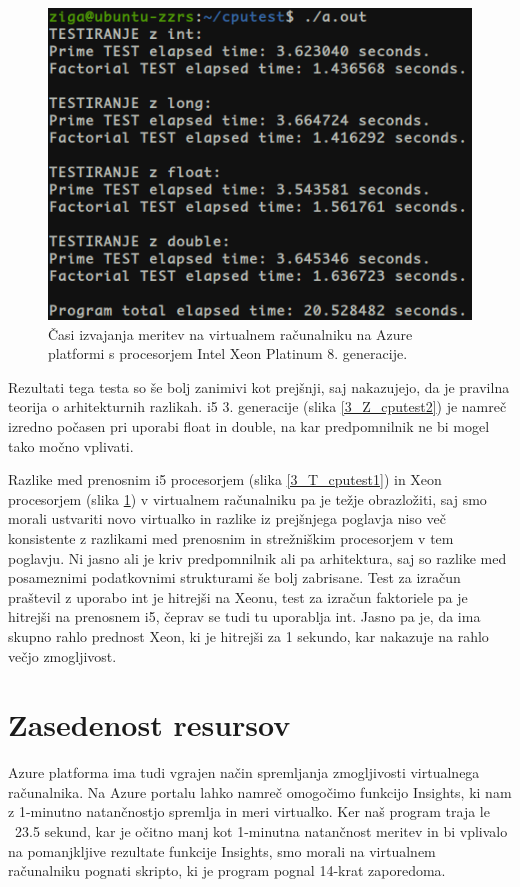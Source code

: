 \begin{figure}[H]
	\centering
	\includegraphics[scale=0.55]{Img/3_Azure_cputest2.png}
	\caption{Časi izvajanja meritev na virtualnem računalniku na Azure platformi s procesorjem Intel Xeon Platinum 8. generacije.}
	\label{Azure_cputest3}
\end{figure}

Rezultati tega testa so še bolj zanimivi kot prejšnji, saj nakazujejo, da je pravilna teorija o arhitekturnih razlikah. i5 3. generacije (slika \ref{3_Z_cputest2}) je namreč izredno počasen pri uporabi float in double, na kar predpomnilnik ne bi mogel tako močno vplivati.

Razlike med prenosnim i5 procesorjem (slika \ref{3_T_cputest1}) in Xeon procesorjem (slika \ref{Azure_cputest3}) v virtualnem računalniku pa je težje obrazložiti, saj smo morali ustvariti novo virtualko in razlike iz prejšnjega poglavja niso več konsistente z razlikami med prenosnim in strežniškim procesorjem v tem poglavju. Ni jasno ali je kriv predpomnilnik ali pa arhitektura, saj so razlike med posameznimi podatkovnimi strukturami še bolj zabrisane. Test za izračun praštevil z uporabo int je hitrejši na Xeonu, test za izračun faktoriele pa je hitrejši na prenosnem i5, čeprav se tudi tu uporablja int. Jasno pa je, da ima skupno rahlo prednost Xeon, ki je hitrejši za 1 sekundo, kar nakazuje na rahlo večjo zmogljivost.



\section{Zasedenost resursov}

Azure platforma ima tudi vgrajen način spremljanja zmogljivosti virtualnega računalnika. Na Azure portalu lahko namreč omogočimo funkcijo Insights, ki nam z 1-minutno natančnostjo spremlja in meri virtualko. Ker naš program traja le ~23.5 sekund, kar je očitno manj kot 1-minutna natančnost meritev in bi vplivalo na pomanjkljive rezultate funkcije Insights, smo morali na virtualnem računalniku pognati skripto, ki je program pognal 14-krat zaporedoma.

